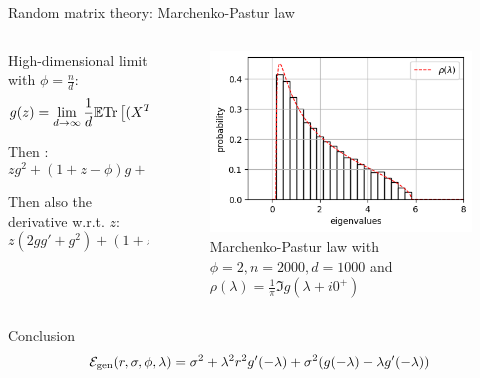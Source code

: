 \documentclass[10pt]{beamer}
\begin{document}
\begin{frame}{Random matrix theory: Marchenko-Pastur law}
  \begin{columns}
    \begin{column}{0.5\textwidth}
      High-dimensional limit with $\phi = \frac{n}{d}$:
      $$
        g(z) = \lim_{d \to \infty} \frac{1}{d}  \mathbb E\text{Tr}\left[(X^TX-zI)^{-1}\right]
      $$
      \vspace*{0.2cm}

      Then \cite{marchenko1967distribution}:
      $$
        z g^2 + (1+z - \phi) g +1 = 0
      $$

      Then also the derivative w.r.t. $z$:
      $$
      z (2gg' + g^2) + (1+z - \phi) g' + g = 0
      $$
    \end{column}
    \begin{column}{0.5\textwidth}
      \begin{figure}
        \centering
        \includegraphics[width=\textwidth]{images/marchenko-pastur.white.png}
        \caption{Marchenko-Pastur law with $\phi = 2, n=2000, d=1000$ and $\rho(\lambda) = \frac{1}{\pi} \Im g(\lambda + i 0^+)$}
      \end{figure}
    \end{column}
  \end{columns}
  \begin{alertblock}{Conclusion \cite{belkin2020two,Hastie-Montanari-2019}}
  $$
  \mathcal E_{\text{gen}}(r,\sigma,\phi,\lambda) = \sigma^2 + \lambda^2 r^2 g'(-\lambda) + \sigma^2 (g(-\lambda) - \lambda g'(-\lambda))
  $$
  \end{alertblock}
\end{frame}
\end{document}
